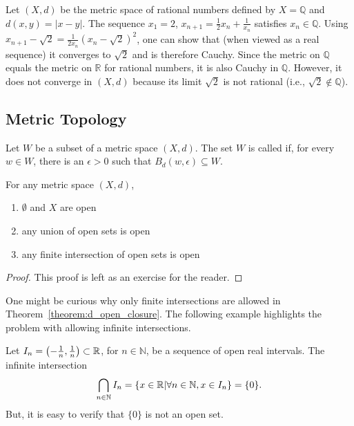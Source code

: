 \begin{example}
Let $(X,d)$ be the metric space  of rational numbers defined by $X=\mathbb{Q}$ and $d(x,y)=|x-y|$.
The sequence $x_1 = 2$, $x_{n+1} = \frac{1}{2}x_n + \frac{1}{x_n}$ satisfies $x_n \in \mathbb{Q}$.
Using $x_{n+1} - \sqrt{2} = \frac{1}{2x_n}(x_n-\sqrt{2})^2$, one can show that (when viewed as a real sequence) it converges to $\sqrt2$ and is therefore Cauchy.
Since the metric on $\mathbb{Q}$ equals the metric on $\mathbb{R}$ for rational numbers, it is also Cauchy in $\mathbb Q$.
However, it does not converge in $(X,d)$ because its limit $\sqrt2$ is not rational (i.e.,  $\sqrt{2} \notin \mathbb{Q}$).
\end{example}


\subsection{Metric Topology}

\begin{definition}
\label{definition:metspace_dopen}
Let $W$ be a subset of a metric space $(X,d)$.
The set $W$ is called  if, for every $w\in W$, there is an $\epsilon>0$ such that $B_d (w,\epsilon) \subseteq W$.
\end{definition}

\begin{theorem}
\label{theorem:d_open_closure}
For any metric space $(X,d)$,
\begin{enumerate}
\item $\emptyset$ and $X$ are open
\item any union of open sets is open
\item any finite intersection of open sets is open
\end{enumerate}
\end{theorem}
\begin{proof}
This proof is left as an exercise for the reader.
\end{proof}

One might be curious why only finite intersections are allowed in Theorem~\ref{theorem:d_open_closure}.
The following example highlights the problem with allowing infinite intersections.
\begin{example}
Let $I_n = \left(-\frac{1}{n},\frac{1}{n} \right) \subset \mathbb{R}$, for $n\in \mathbb{N}$, be a sequence of open real intervals.
The infinite intersection
\[ \bigcap_{n\in \mathbb{N}} I_n = \{ x\in \mathbb{R} | \forall n\in \mathbb{N}, x\in I_n \} = \{0 \}. \]
But, it is easy to verify that $\{ 0 \}$ is not an open set.
\end{example}

